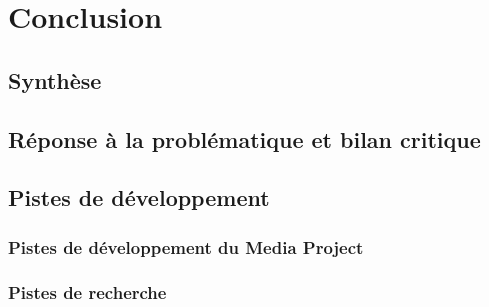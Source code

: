 \section{Conclusion} \label{chap:conclusion}

\subsection{Synthèse}



\subsection{Réponse à la problématique et bilan critique}



\subsection{Pistes de développement}

\subsubsection{Pistes de développement du Media Project}



\subsubsection{Pistes de recherche}

